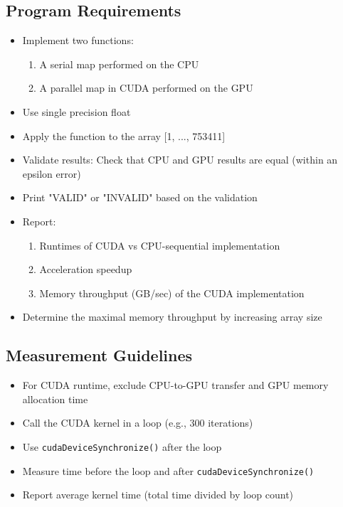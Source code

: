 \documentclass{article}
\begin{document}
\subsection{Program Requirements}

\begin{itemize}
    \item Implement two functions:
    \begin{enumerate}
        \item A serial map performed on the CPU
        \item A parallel map in CUDA performed on the GPU
    \end{enumerate}
    \item Use single precision float
    \item Apply the function to the array [1, ..., 753411]
    \item Validate results: Check that CPU and GPU results are equal (within an epsilon error)
    \item Print "VALID" or "INVALID" based on the validation
    \item Report:
    \begin{enumerate}
        \item Runtimes of CUDA vs CPU-sequential implementation
        \item Acceleration speedup
        \item Memory throughput (GB/sec) of the CUDA implementation
    \end{enumerate}
    \item Determine the maximal memory throughput by increasing array size
\end{itemize}

\subsection{Measurement Guidelines}

\begin{itemize}
    \item For CUDA runtime, exclude CPU-to-GPU transfer and GPU memory allocation time
    \item Call the CUDA kernel in a loop (e.g., 300 iterations)
    \item Use \texttt{cudaDeviceSynchronize()} after the loop
    \item Measure time before the loop and after \texttt{cudaDeviceSynchronize()}
    \item Report average kernel time (total time divided by loop count)
\end{itemize}
\end{document}
